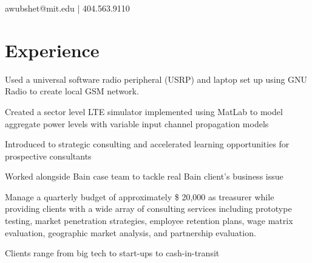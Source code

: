 \documentclass[letterpaper, article]{deedy-resume-openfont}
\begin{document}
%
%


{awubshet@mit.edu | 404.563.9110}

%
%
\hfill

\begin{minipage}[t]{0.66\textwidth} 
\vspace{.01cm}
\section{Experience}

\vspace{\topsep} %
\begin{tightemize}
	\item Used a universal software radio peripheral (USRP) and laptop set up using GNU Radio to create local GSM network. 
	\item Created a sector level LTE simulator implemented using MatLab to model aggregate power levels with variable input channel propagation models 
\end{tightemize}
\sectionsep

\begin{tightemize}
	\item Introduced to strategic consulting and accelerated learning opportunities for prospective consultants
	\item Worked alongside Bain case team to tackle real Bain client's business issue
\end{tightemize}
\sectionsep

\begin{tightemize}
	\item Manage a quarterly budget of approximately \$ 20,000 as treasurer while providing clients with a wide array of consulting services including prototype testing, market penetration strategies, employee retention plans, wage matrix evaluation, geographic market analysis, and partnership evaluation. 
	\item Clients range from big tech to start-ups to cash-in-transit
\end{tightemize}
\sectionsep


\end{minipage}
\end{document}
